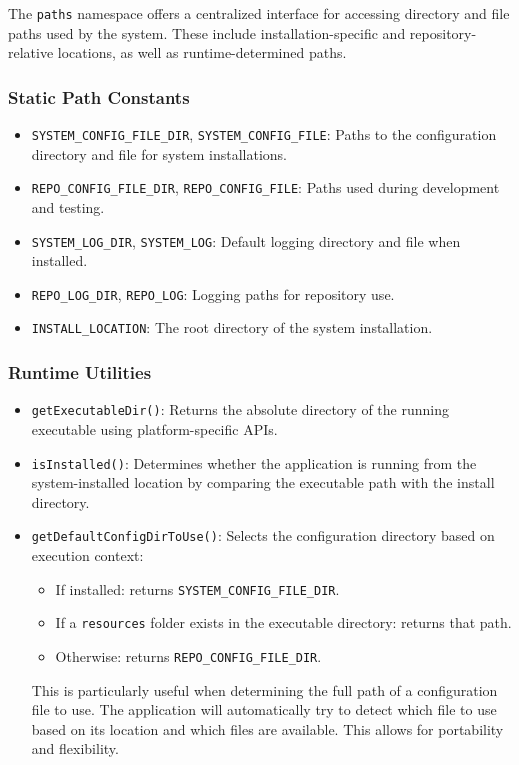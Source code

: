The \texttt{paths} namespace offers a centralized interface for accessing directory and file paths used by the system. These include installation-specific and repository-relative locations, as well as runtime-determined paths.

\subsubsection*{Static Path Constants}
\begin{itemize}\itemsep0em
	\item \texttt{SYSTEM\_CONFIG\_FILE\_DIR}, \texttt{SYSTEM\_CONFIG\_FILE}: Paths to the configuration directory and file for system installations.
	\item \texttt{REPO\_CONFIG\_FILE\_DIR}, \texttt{REPO\_CONFIG\_FILE}: Paths used during development and testing.
	\item \texttt{SYSTEM\_LOG\_DIR}, \texttt{SYSTEM\_LOG}: Default logging directory and file when installed.
	\item \texttt{REPO\_LOG\_DIR}, \texttt{REPO\_LOG}: Logging paths for repository use.
	\item \texttt{INSTALL\_LOCATION}: The root directory of the system installation.
\end{itemize}

\subsubsection*{Runtime Utilities} \label{sec:global-constants-utilities}
\begin{itemize}\itemsep0em
	\item \texttt{getExecutableDir()}: Returns the absolute directory of the running executable using platform-specific APIs.
	
	\item \texttt{isInstalled()}: Determines whether the application is running from the system-installed location by comparing the executable path with the install directory.
	
	\item \texttt{getDefaultConfigDirToUse()}: Selects the configuration directory based on execution context:
	\begin{itemize}\itemsep0em
		\item If installed: returns \texttt{SYSTEM\_CONFIG\_FILE\_DIR}.
		\item If a \texttt{resources} folder exists in the executable directory: returns that path.
		\item Otherwise: returns \texttt{REPO\_CONFIG\_FILE\_DIR}.
	\end{itemize}
	This is particularly useful when determining the full path of a configuration file to use. The application will automatically try to detect which file to use based on its location and which files are available. This allows for portability and flexibility.
\end{itemize}

